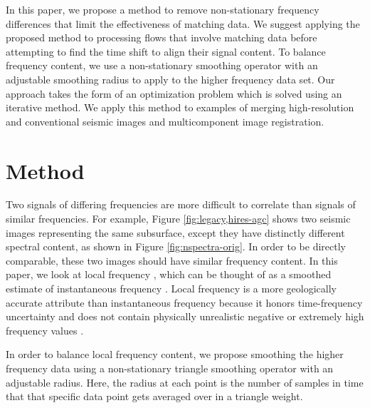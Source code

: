         In this paper, we propose a method to remove non-stationary frequency differences that limit
        the effectiveness of matching data. We suggest applying the proposed method to processing
        flows that involve matching data before attempting to find the time shift to align their
        signal content. To balance frequency content, we use a non-stationary smoothing operator
        with an adjustable smoothing radius to apply to the higher frequency data set. Our approach
        takes the form of an optimization problem which is solved using an iterative method. We
        apply this method to examples of merging high-resolution and conventional seismic images and
        multicomponent image registration.

\section{Method}
        Two signals of differing frequencies are more difficult to correlate than signals of similar
        frequencies.  For example, Figure \ref{fig:legacy,hires-agc} shows two seismic images
        representing the same subsurface, except they have distinctly different spectral content, as
        shown in Figure \ref{fig:nspectra-orig}. In order to be directly comparable, these two
        images should have similar frequency content.
        In this paper, we look at local frequency \cite[]{attr}, which can be thought of as a
        smoothed estimate of instantaneous frequency \cite[]{white}. Local frequency is a more
        geologically accurate attribute than instantaneous frequency because it honors
        time-frequency uncertainty and does not contain physically unrealistic negative or extremely
        high frequency values \cite[]{attr}.

        In order to balance local frequency content, we propose smoothing the higher frequency data
        using a non-stationary triangle smoothing operator with an adjustable radius. Here, the
        radius at each point is the number of samples in time that that specific data point gets 
        averaged over
        in a triangle weight.


